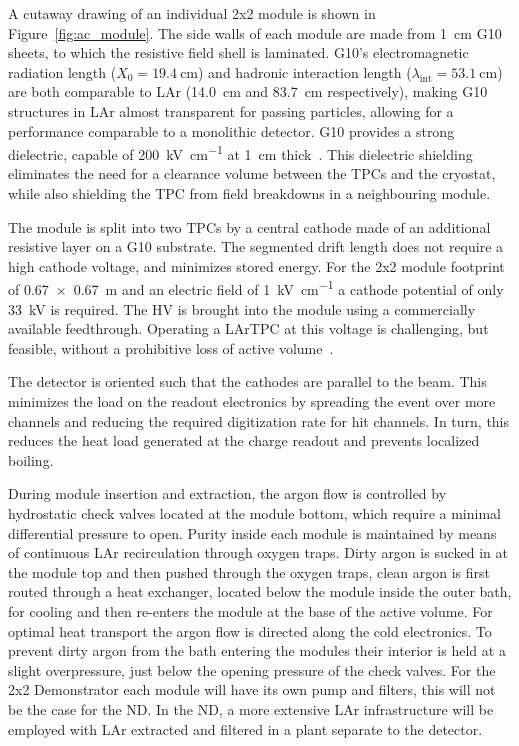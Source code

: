 A cutaway drawing of an individual 2x2 module is shown in Figure~\ref{fig:ac_module}. The side walls of each module are made from \SI{1}{\centi\metre} G10 sheets, to which the resistive field shell is laminated. G10's electromagnetic radiation length ($X_{\mathrm{0}} = \SI{19.4}{\centi\metre}$) and hadronic interaction length ($\lambda_{\mathrm{int}} = \SI{53.1}{\centi\metre}$)~\cite{pdg_g10} are both comparable to LAr (14.0~cm and 83.7~cm respectively), making G10 structures in LAr almost transparent for passing particles, allowing for a performance comparable to a monolithic detector. G10 provides a strong dielectric, capable of \SI{200}{\kilo\volt\per\centi\metre} at \SI{1}{\centi\metre} thick~\cite{G10Breakdown}. This dielectric shielding eliminates the need for a clearance volume between the TPCs and the cryostat, while also shielding the TPC from field breakdowns in a neighbouring module. 

The module is split into two TPCs by a central cathode made of an additional resistive layer on a G10 substrate. The segmented drift length does not require a high cathode voltage, and minimizes stored energy. For the 2x2 module footprint of \SI{0.67 x 0.67}{\metre} and an electric field of \SI{1}{\kilo\volt\per\centi\metre} a cathode potential of only \SI{33}{\kilo\volt} is required. The HV is brought into the module using a commercially available feedthrough. Operating a LArTPC at this voltage is challenging, but feasible, without a prohibitive loss of active volume~\cite{argontube}.

The detector is oriented such that the cathodes are parallel to the beam. This minimizes the load on the readout electronics by spreading the event over more channels and reducing the required digitization rate for hit channels. In turn, this reduces the heat load generated at the charge readout and prevents localized boiling.


During module insertion and extraction, the argon flow is controlled by hydrostatic check valves located at the module bottom, which require a minimal differential pressure to open. Purity inside each module is maintained by means of continuous LAr recirculation through oxygen traps. Dirty argon is sucked in at the module top and then pushed through the oxygen traps, clean argon is first routed through a heat exchanger, located below the module inside the outer bath, for cooling and then re-enters the module at the base of the active volume. For optimal heat transport the argon flow is directed along the cold electronics. To prevent dirty argon from the bath entering the modules their interior is held at a slight overpressure, just below the opening pressure of the check valves. For the 2x2 Demonstrator each module will have its own pump and filters, this will not be the case for the ND. In the ND, a more extensive LAr infrastructure will be employed with LAr extracted and filtered in a plant separate to the detector.  

